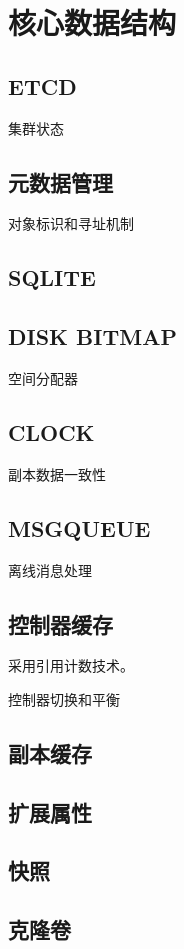 \chapter{核心数据结构}

\section{ETCD}

集群状态

\section{元数据管理}

对象标识和寻址机制

\section{SQLITE}

\section{DISK BITMAP}

空间分配器

\section{CLOCK}

副本数据一致性

\section{MSGQUEUE}

离线消息处理

\section{控制器缓存}

采用引用计数技术。

控制器切换和平衡

\section{副本缓存}

\section{扩展属性}

\section{快照}

\section{克隆卷}

